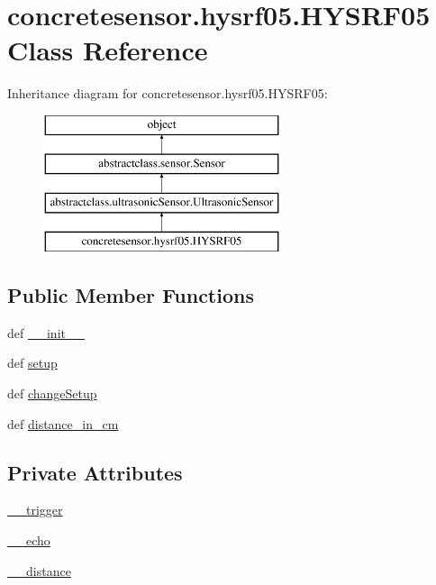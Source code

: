 \hypertarget{classconcretesensor_1_1hysrf05_1_1HYSRF05}{}\section{concretesensor.\+hysrf05.\+H\+Y\+S\+R\+F05 Class Reference}
\label{classconcretesensor_1_1hysrf05_1_1HYSRF05}
Inheritance diagram for concretesensor.\+hysrf05.\+H\+Y\+S\+R\+F05\+:\begin{figure}[H]
\begin{center}
\leavevmode
\includegraphics[height=4.000000cm]{classconcretesensor_1_1hysrf05_1_1HYSRF05}
\end{center}
\end{figure}
\subsection*{Public Member Functions}
\begin{DoxyCompactItemize}
\item 
def \hyperlink{classconcretesensor_1_1hysrf05_1_1HYSRF05_aa60ec0a3b67332feb5d62eebfad7a3fe}{\+\_\+\+\_\+init\+\_\+\+\_\+}
\item 
def \hyperlink{classconcretesensor_1_1hysrf05_1_1HYSRF05_a6b576976bfa206e95747b48746c2d76e}{setup}
\item 
def \hyperlink{classconcretesensor_1_1hysrf05_1_1HYSRF05_a69add31fc0be3be0280359374e3f3dec}{change\+Setup}
\item 
def \hyperlink{classconcretesensor_1_1hysrf05_1_1HYSRF05_a0b2e3e84739f7b2437bcd0ded4876596}{distance\+\_\+in\+\_\+cm}
\end{DoxyCompactItemize}
\subsection*{Private Attributes}
\begin{DoxyCompactItemize}
\item 
\hyperlink{classconcretesensor_1_1hysrf05_1_1HYSRF05_a565f8ac07d5da57c0c9059ccb6e77455}{\+\_\+\+\_\+trigger}
\item 
\hyperlink{classconcretesensor_1_1hysrf05_1_1HYSRF05_a5d62e7ba8857147943018422ec4e283d}{\+\_\+\+\_\+echo}
\item 
\hyperlink{classconcretesensor_1_1hysrf05_1_1HYSRF05_a5d60d1ca2933efdc8a1679b5b21b3279}{\+\_\+\+\_\+distance}
\end{DoxyCompactItemize}


